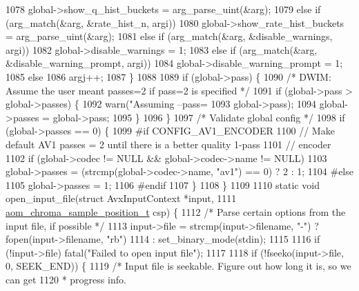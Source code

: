 \begin{DoxyCodeInclude}
{{{{{{{{{{{{{{1078       global->show\_q\_hist\_buckets = arg\_parse\_uint(&arg);
1079     \textcolor{keywordflow}{else} \textcolor{keywordflow}{if} (arg\_match(&arg, &rate\_hist\_n, argi))
1080       global->show\_rate\_hist\_buckets = arg\_parse\_uint(&arg);
1081     \textcolor{keywordflow}{else} \textcolor{keywordflow}{if} (arg\_match(&arg, &disable\_warnings, argi))
1082       global->disable\_warnings = 1;
1083     \textcolor{keywordflow}{else} \textcolor{keywordflow}{if} (arg\_match(&arg, &disable\_warning\_prompt, argi))
1084       global->disable\_warning\_prompt = 1;
1085     \textcolor{keywordflow}{else}
1086       argj++;
1087   \}
1088 
1089   \textcolor{keywordflow}{if} (global->pass) \{
1090     \textcolor{comment}{/* DWIM: Assume the user meant passes=2 if pass=2 is specified */}
1091     \textcolor{keywordflow}{if} (global->pass > global->passes) \{
1092       warn(\textcolor{stringliteral}{"Assuming --pass=%
1093            global->pass);
1094       global->passes = global->pass;
1095     \}
1096   \}
1097   \textcolor{comment}{/* Validate global config */}
1098   \textcolor{keywordflow}{if} (global->passes == 0) \{
1099 \textcolor{preprocessor}{#if CONFIG\_AV1\_ENCODER}
1100     \textcolor{comment}{// Make default AV1 passes = 2 until there is a better quality 1-pass}
1101     \textcolor{comment}{// encoder}
1102     \textcolor{keywordflow}{if} (global->codec != NULL && global->codec->name != NULL)
1103       global->passes = (strcmp(global->codec->name, \textcolor{stringliteral}{"av1"}) == 0) ? 2 : 1;
1104 \textcolor{preprocessor}{#else}
1105     global->passes = 1;
1106 \textcolor{preprocessor}{#endif}
1107   \}
1108 \}
1109 
1110 \textcolor{keyword}{static} \textcolor{keywordtype}{void} open\_input\_file(\textcolor{keyword}{struct} AvxInputContext *input,
1111                             \hyperlink{aom__image_8h_a48f259fc7774b1c799b3ebe7530c19bd}{aom\_chroma\_sample\_position\_t} csp) \{
1112   \textcolor{comment}{/* Parse certain options from the input file, if possible */}
1113   input->file = strcmp(input->filename, \textcolor{stringliteral}{"-"}) ? fopen(input->filename, \textcolor{stringliteral}{"rb"})
1114                                              : set\_binary\_mode(stdin);
1115 
1116   \textcolor{keywordflow}{if} (!input->file) fatal(\textcolor{stringliteral}{"Failed to open input file"});
1117 
1118   \textcolor{keywordflow}{if} (!fseeko(input->file, 0, SEEK\_END)) \{
1119     \textcolor{comment}{/* Input file is seekable. Figure out how long it is, so we can get}
1120 \textcolor{comment}{     * progress info.}
}}}}}}}}}}}}}}}
\end{DoxyCodeInclude}

